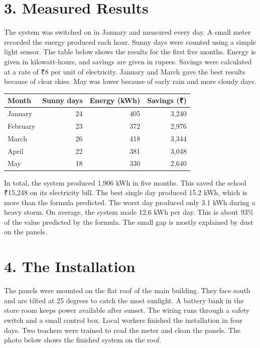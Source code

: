 \documentclass{article}
\begin{document}
\section*{3. Measured Results}

The system was switched on in January and measured every day.
A small meter recorded the energy produced each hour.
Sunny days were counted using a simple light sensor.
The table below shows the results for the first five months.
Energy is given in kilowatt-hours, and savings are given in rupees.
Savings were calculated at a rate of ₹8 per unit of electricity.
January and March gave the best results because of clear skies.
May was lower because of early rain and more cloudy days.

\begin{table}[h]
\centering
\label{tab:results}
\begin{tabular}{lrrr}
Month & Sunny days & Energy (kWh) & Savings (₹) \\
\hline
January & 24 & 405 & 3,240 \\
February & 23 & 372 & 2,976 \\
March & 26 & 418 & 3,344 \\
April & 22 & 381 & 3,048 \\
May & 18 & 330 & 2,640 \\
\end{tabular}
\end{table}

In total, the system produced 1,906 kWh in five months.
This saved the school ₹15,248 on its electricity bill.
The best single day produced 15.2 kWh, which is more than the formula predicted.
The worst day produced only 3.1 kWh during a heavy storm.
On average, the system made 12.6 kWh per day.
This is about 93\% of the value predicted by the formula.
The small gap is mostly explained by dust on the panels.

\section*{4. The Installation}

The panels were mounted on the flat roof of the main building.
They face south and are tilted at 25 degrees to catch the most sunlight.
A battery bank in the store room keeps power available after sunset.
The wiring runs through a safety switch and a small control box.
Local workers finished the installation in four days.
Two teachers were trained to read the meter and clean the panels.
The photo below shows the finished system on the roof.
\end{document}

